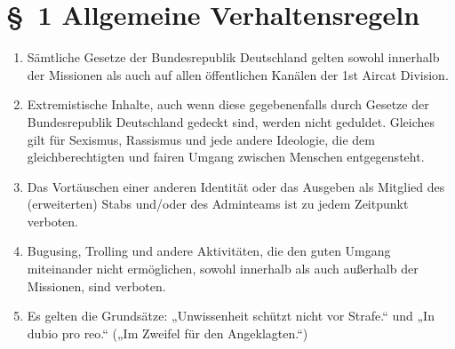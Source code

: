 \section*{\S~1 Allgemeine Verhaltensregeln}
 
\label{sec:allgemeine_verhaltensregeln}

\begin{enumerate}[label=(\arabic*)]
    \item Sämtliche Gesetze der Bundesrepublik Deutschland gelten sowohl innerhalb der Missionen als auch auf allen öffentlichen Kanälen der 1st Aircat Division.
    \item Extremistische Inhalte, auch wenn diese gegebenenfalls durch Gesetze der Bundesrepublik Deutschland gedeckt sind, werden nicht geduldet. Gleiches gilt für Sexismus, Rassismus und jede andere Ideologie, die dem gleichberechtigten und fairen Umgang zwischen Menschen entgegensteht.
    \item Das Vortäuschen einer anderen Identität oder das Ausgeben als Mitglied des (erweiterten) Stabs und/oder des Adminteams ist zu jedem Zeitpunkt verboten.
    \item Bugusing, Trolling und andere Aktivitäten, die den guten Umgang miteinander nicht ermöglichen, sowohl innerhalb als auch außerhalb der Missionen, sind verboten.
    \item Es gelten die Grundsätze: „Unwissenheit schützt nicht vor Strafe.“ und „In dubio pro reo.“ („Im Zweifel für den Angeklagten.“)
\end{enumerate}